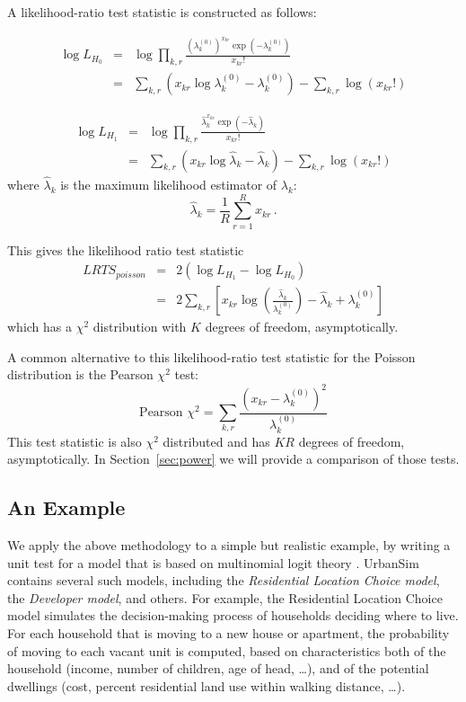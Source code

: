 \documentclass{sig-alternate}
\begin{document}
A likelihood-ratio test statistic is constructed as follows:

\begin{eqnarray*}
\log L_{H_0}& =& \log \prod_{k,r} \frac{(\lambda_k^{(0)})^{x_{kr}}
    \exp(-\lambda_k^{(0)})}{x_{kr}!} \\
 &= &\sum_{k,r} (x_{kr}\log \lambda_k^{(0)}
    - \lambda_k^{(0)}) - \sum_{k,r} \log (x_{kr}!)
\end{eqnarray*}


 \begin{eqnarray*}
\log L_{H_1} &= &\log \prod_{k,r} \frac{\hat{\lambda}_{k}^{x_{kr}}
    \exp(-\hat{\lambda}_{k})}{x_{kr}!} \\
&= &\sum_{k,r} (x_{kr}\log \hat{\lambda}_{k}
    - \hat{\lambda}_{k}) - \sum_{k,r} \log (x_{kr}!)
\end{eqnarray*}
where $\hat{\lambda}_{k}$ is the maximum likelihood estimator of $\lambda_{k}$:
\[
\hat{\lambda}_{k} = \frac{1}{R}\sum_{r=1}^R x_{kr}\,.
\]

This gives the likelihood ratio test statistic
\begin{eqnarray*}
LRTS_{poisson}  & = & 2(\log L_{H_1} - \log L_{H_0}) \\
&= &2 \sum_{k,r} \left[ x_{kr} \log
\left(\frac{\hat{\lambda}_{k}}{\lambda_k^{(0)}}\right) - \hat{\lambda}_{k} + \lambda_k^{(0)} \right]
\end{eqnarray*}
which has a $\chi^2$ distribution with $K$
degrees of freedom, asymptotically.

A common alternative to this likelihood-ratio test statistic for the Poisson
distribution is the Pearson $\chi^2$ test:
\[
\text{Pearson } \chi^2 = \sum_{k,r} \frac{(x_{kr} - \lambda_k^{(0)})^2}{\lambda_k^{(0)}}
\]
This test statistic is also $\chi^2$ distributed and has $KR$
degrees of freedom, asymptotically. In Section~\ref{sec:power} we will provide a
comparison of those tests.


\subsection{An Example}
\label{sec:example}

We apply the above methodology to a simple but realistic example, by
writing a unit test for a model that is based on multinomial logit theory
\cite{ben-akiva-lerman-1987,train-book-2003}.  UrbanSim contains several
such models, including the \emph{Residential Location Choice model}, the
\emph{Developer model}, and others.  For example, the Residential Location
Choice model simulates the decision-making process of households deciding
where to live.  For each household that is moving to a new house or
apartment, the probability of moving to each vacant unit is computed, based
on characteristics both of the household (income, number of children, age
of head, \ldots), and of the potential dwellings (cost, percent residential
land use within walking distance, \ldots).
\end{document}
